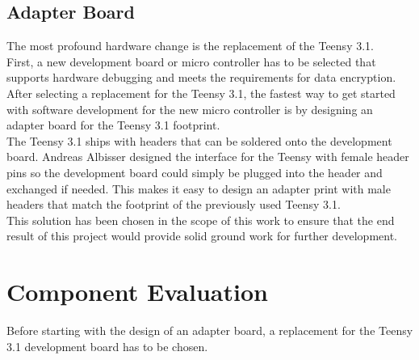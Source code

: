 \subsection{Adapter Board}
The most profound hardware change is the replacement of the Teensy 3.1.\\
First, a new development board or micro controller has to be selected that supports hardware debugging and meets the requirements for data encryption. \\
After selecting a replacement for the Teensy 3.1, the fastest way to get started with software development for the new micro controller is by designing an adapter board for the Teensy 3.1 footprint. \\
The Teensy 3.1 ships with headers that can be soldered onto the development board. Andreas Albisser designed the interface for the Teensy with female header pins so the development board could simply be plugged into the header and exchanged if needed. This makes it easy to design an adapter print with male headers that match the footprint of the previously used Teensy 3.1. \\
This solution has been chosen in the scope of this work to ensure that the end result of this project would provide solid ground work for further development.
%
%
%
\section{Component Evaluation}
Before starting with the design of an adapter board, a replacement for the Teensy 3.1 development board has to be chosen. \\
%
